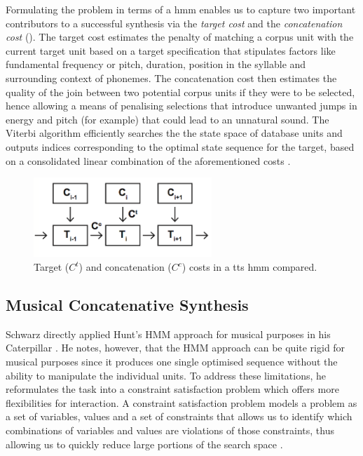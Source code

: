 Formulating the problem in terms of a \acrshort{hmm} enables us to capture two important contributors to a successful synthesis via the \textit{target cost} and the \textit{concatenation cost} (). The target cost estimates the penalty of matching a corpus unit with the current target unit based on a target specification that stipulates factors like fundamental frequency or pitch, duration, position in the syllable and surrounding context of phonemes. The concatenation cost then estimates the quality of the join between two potential corpus units if they were to be selected, hence allowing a means of penalising selections that introduce unwanted jumps in energy and pitch (for example) that could lead to an unnatural sound. The Viterbi algorithm efficiently searches the the state space of database units and outputs indices corresponding to the optimal state sequence for the target, based on a consolidated linear combination of the aforementioned costs \citep{Ob1995, Hunt1996}.

\begin{figure}
	\begin{center}
		\includegraphics[width=0.6\textwidth]{ch04_sota/figures/costs.png}
	\end{center}
	\caption[Target  and concatenation costs in a text-to-speech Hidden Markov Model compared]{Target ($C^{t}$) and concatenation ($C^{c}$) costs in a \acrshort{tts} \acrshort{hmm} compared.}
	\label{fig:target_concat_costs}
\end{figure}

\subsection{Musical Concatenative Synthesis}
 
Schwarz directly applied Hunt’s HMM approach for musical purposes in his Caterpillar \citep{Schwarz2003}. He notes, however, that the HMM approach can be quite rigid for musical purposes since it produces one single optimised sequence without the ability to manipulate the individual units. To address these limitations, he reformulates the task into a constraint satisfaction problem which offers more flexibilities for interaction. A constraint satisfaction problem models a problem as a set of variables, values and a set of constraints that allows us to identify which combinations of variables and values are violations of those constraints, thus allowing us to quickly reduce large portions of the search space \citep{Russell2002}. 

